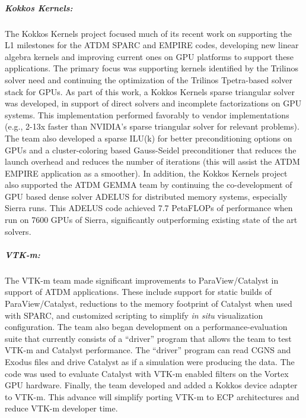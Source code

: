 \subparagraph{Kokkos Kernels:} The Kokkos Kernels project focused much of its recent work on supporting the L1 milestones for the ATDM SPARC and EMPIRE codes, developing new linear algebra kernels and improving current ones on GPU platforms to support these applications. The primary focus was supporting kernels identified by the Trilinos solver need and continuing the optimization of the Trilinos Tpetra-based solver stack for GPUs. As part of this work, a Kokkos Kernels sparse triangular solver was developed, in support of direct solvers and incomplete factorizations on GPU systems.  This implementation performed favorably to vendor implementations (e.g., 2-13x faster than NVIDIA's sparse triangular solver for relevant problems).  The team also developed a sparse ILU(k) for better preconditioning options on GPUs and a cluster-coloring based Gauss-Seidel preconditioner that reduces the launch overhead and reduces the number of iterations (this will assist the ATDM EMPIRE application as a smoother). In addition, the Kokkos Kernels project also supported the ATDM GEMMA team by continuing the co-development of GPU based dense solver ADELUS for distributed memory systems, especially Sierra runs. This ADELUS code achieved 7.7 PetaFLOPs of performance when run on 7600 GPUs of Sierra, significantly outperforming existing state of the art solvers. 
 

\subparagraph{VTK-m:} The VTK-m team made significant improvements to ParaView/Catalyst in support of ATDM applications. These include support for static builds of ParaView/Catalyst, reductions to the memory footprint of Catalyst when used with SPARC, and customized scripting to simplify \emph{in situ} visualization configuration. The team also began development on a performance-evaluation suite that currently consists of a ``driver'' program that allows the team to test VTK-m and Catalyst performance.  The ``driver'' program can read CGNS and Exodus files and drive Catalyst as if a simulation were producing the data. The code was used to evaluate Catalyst with VTK-m enabled filters on the Vortex GPU hardware.  Finally, the team developed and added a Kokkos device adapter to VTK-m.  This advance will simplify porting VTK-m to ECP architectures and reduce VTK-m developer time.

